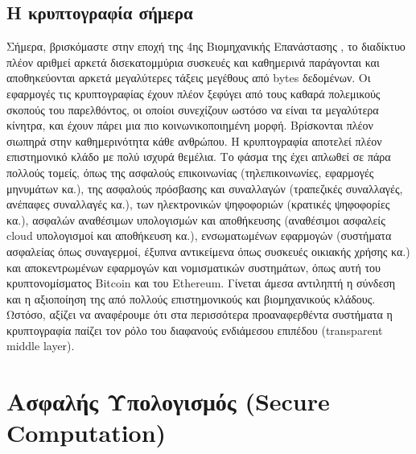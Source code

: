 \subsection{Η κρυπτογραφία σήμερα}
Σήμερα, βρισκόμαστε στην εποχή της 4ης Βιομηχανικής Επανάστασης \cite{drath2014industrie} \cite{skilton20184th}, το διαδίκτυο πλέον αριθμεί αρκετά δισεκατομμύρια συσκευές και καθημερινά παράγονται και αποθηκεύονται αρκετά μεγαλύτερες τάξεις μεγέθους από bytes δεδομένων. Οι εφαρμογές τις κρυπτογραφίας έχουν πλέον ξεφύγει από τους καθαρά πολεμικούς σκοπούς του παρελθόντος, οι οποίοι συνεχίζουν ωστόσο να είναι τα μεγαλύτερα κίνητρα, και έχουν πάρει μια πιο κοινωνικοποιημένη μορφή. Βρίσκονται πλέον σιωπηρά στην καθημερινότητα κάθε ανθρώπου. Η κρυπτογραφία αποτελεί πλέον επιστημονικό κλάδο με πολύ ισχυρά θεμέλια. Το φάσμα της έχει απλωθεί σε πάρα πολλούς τομείς, όπως της ασφαλούς επικοινωνίας (τηλεπικοινωνίες, εφαρμογές μηνυμάτων κα.), της ασφαλούς πρόσβασης και συναλλαγών (τραπεζικές συναλλαγές, ανέπαφες συναλλαγές κα.), των ηλεκτρονικών ψηφοφοριών (κρατικές ψηφοφορίες κα.), ασφαλών αναθέσιμων υπολογισμών και αποθήκευσης (αναθέσιμοι ασφαλείς cloud υπολογισμοί και αποθήκευση κα.), ενσωματωμένων εφαρμογών (συστήματα ασφαλείας όπως συναγερμοί, έξυπνα αντικείμενα όπως συσκευές οικιακής χρήσης κα.) και αποκεντρωμένων εφαρμογών και νομισματικών συστημάτων, όπως αυτή του κρυπτονομίσματος Bitcoin και του Ethereum. Γίνεται άμεσα αντιληπτή η σύνδεση και η αξιοποίηση της από πολλούς επιστημονικούς και βιομηχανικούς κλάδους. Ωστόσο, αξίζει να αναφέρουμε ότι στα περισσότερα προαναφερθέντα συστήματα η κρυπτογραφία παίζει τον ρόλο του διαφανούς ενδιάμεσου επιπέδου (transparent middle layer).

\section{Ασφαλής Υπολογισμός (Secure Computation)}

